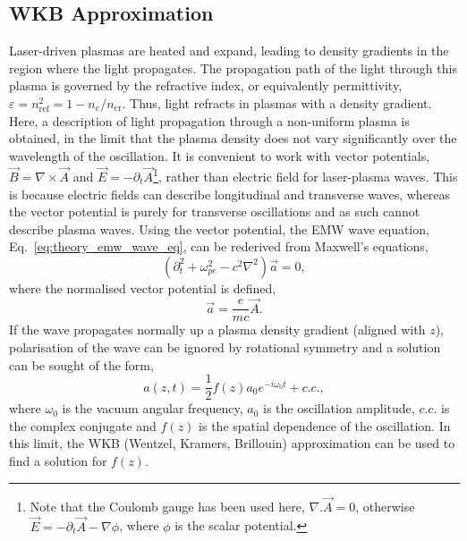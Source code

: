 \subsection{WKB Approximation}%
\label{sec:theory_WKB}

Laser-driven plasmas are heated and expand, leading to density gradients in the region where the light propagates.
The propagation path of the light through this plasma is governed by the refractive index, or equivalently permittivity, $\varepsilon = n_{\text{ref}}^2=1-n_e/n_{\text{cr}}$.
Thus, light refracts in plasmas with a density gradient.
Here, a description of light propagation through a non-uniform plasma is obtained, in the limit that the plasma density does not vary significantly over the wavelength of the oscillation.
It is convenient to work with vector potentials, $\vec{B} = \nabla\times\vec{A}$ and $\vec{E} = -\partial_t\vec{A}$\footnote{Note that the Coulomb gauge has been used here, $\nabla.\vec{A}=0$, otherwise $\vec{E}=-\partial_t\vec{A}-\nabla\phi$, where $\phi$ is the scalar potential.}, rather than electric field for laser-plasma waves.
This is because electric fields can describe longitudinal and transverse waves, whereas the vector potential is purely for transverse oscillations and as such cannot describe plasma waves.
Using the vector potential, the \ac{EMW} wave equation, Eq.~\ref{eq:theory_emw_wave_eq}, can be rederived from Maxwell's equations,
\begin{equation}
    \label{eq:theory_waveeq_a}
    \left( \partial_t^2 + \omega_{pe}^2 - c^2\nabla^2 \right)\vec{a} = 0,
\end{equation}
where the normalised vector potential is defined,
\begin{equation}
    \vec{a} = \frac{e}{m c}\vec{A}.
\end{equation}
If the wave propagates normally up a plasma density gradient (aligned with $z$), polarisation of the wave can be ignored by rotational symmetry and a solution can be sought of the form,
\begin{equation}
    \label{eq:theory_fz}
    a(z,t) = \frac{1}{2} f(z) a_0e^{-i\omega_0 t} + c.c.,
\end{equation}
where $\omega_0$ is the vacuum angular frequency, $a_0$ is the oscillation amplitude, $c.c.$ is the complex conjugate and $f(z)$ is the spatial dependence of the oscillation.
In this limit, the WKB (Wentzel, Kramers, Brillouin) approximation can be used to find a solution for $f(z)$.

